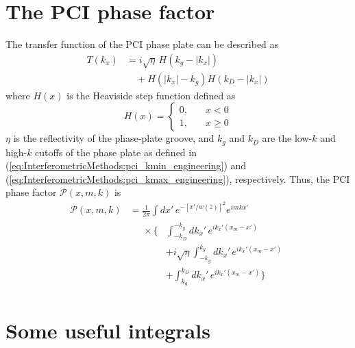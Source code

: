 \section{The PCI phase factor}
The transfer function of the PCI phase plate can be described as
\begin{equation}
  \begin{aligned}
    T(k_x)
    &=
    i \sqrt{\eta} \, H(k_g - |k_x|)
    \\
    &\quad +
    H(|k_x| - k_g)
    H(k_D - |k_x|)
  \end{aligned}
  \label{eq:PCIResponseIdentities:phase_plate_transfer_function}
\end{equation}
where $H(x)$ is the Heaviside step function defined as
\begin{equation}
  H(x)
  =
  \begin{cases}
    0, \quad &x < 0 \\
    1, \quad &x \geq 0
  \end{cases}
  \label{eq:PCIResponseIdentities:Heaviside_step_function}
\end{equation}
$\eta$ is the reflectivity of the phase-plate groove, and
$k_g$ and $k_D$ are the low-$k$ and high-$k$ cutoffs of the phase plate
as defined in
(\ref{eq:InterferometricMethods:pci_kmin_engineering}) and
(\ref{eq:InterferometricMethods:pci_kmax_engineering}), respectively.
Thus, the PCI phase factor $\mathcal{P}(x, m, k)$ is
\begin{equation}
  \begin{aligned}
    \mathcal{P}(x, m, k)
    &=
    \frac{1}{2 \pi}
    \int dx' \,
    e^{-\left[ x' / w(z) \right]^2}
    e^{i m k x'}
    \\
    &\begin{aligned}
      \quad
      \times
      \Biggl\{%
        &\int_{-k_D}^{-k_g} dk_x' \,
        e^{i k_x' (x_m - x')}
        \\
        &+
        i \sqrt{\eta}
        \int_{-k_g}^{k_g} dk_x' \,
        e^{i k_x' (x_m - x')}
        \\
        &+
        \int_{k_g}^{k_D} dk_x' \,
        e^{i k_x' (x_m - x')}
      \Biggr\}
    \end{aligned}
  \end{aligned}
  \label{eq:PCIResponseIdentities:mth_diffracted_beam_kx_filtered_phase_factor_near_field_integrals}
\end{equation}


\section{Some useful integrals}


